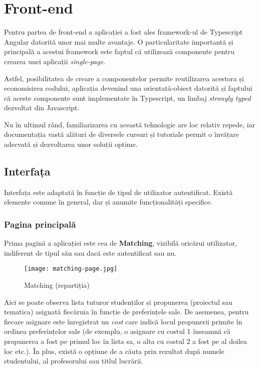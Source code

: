 \chapter{Front-end}

Pentru partea de front-end a aplicației a fost ales framework-ul de Typescript Angular datorită unor mai multe avantaje. O particularitate importantă și principală a acestui framework este faptul că utilizează componente pentru crearea unei aplicații \textit{single-page}.

Astfel, posibilitatea de creare a componentelor permite reutilizarea acestora și economisirea codului, aplicația devenind una orientată-obiect datorită și faptului că aceste componente sunt implementate în Typescript, un limbaj \textit{strongly typed} dezvoltat din Javascript.

Nu în ultimul rând, familiarizarea cu această tehnologie are loc relativ repede, iar documentația vastă alături de diversele cursuri și tutoriale permit o învățare adecvată și dezvoltarea unor soluții optime.

\section{Interfața}

Interfața este adaptată în funcție de tipul de utilizator autentificat. Există elemente comune în general, dar și anumite funcționalități specifice.

\subsection{Pagina principală}

Prima pagină a aplicației \thesistitle{} este cea de \textbf{Matching}, vizibilă oricărui utilizator, indiferent de tipul său sau dacă este autentificat sau nu.

\begin{figure}[H]
	\centering
	\texttt{[image: matching-page.jpg]}
	\caption{Matching (repartiția)}
\end{figure}

Aici se poate observa lista tuturor studenților și propunerea (proiectul sau tematica) asignată fiecăruia în funcție de preferințele sale. De asemenea, pentru fiecare asignare este înregistrat un \textit{cost} care indică locul propunerii primite în ordinea preferințelor sale (de exemplu, o asignare cu costul 1 înseamnă că propunerea a fost pe primul loc în lista sa, o alta cu costul 2 a fost pe al doilea loc etc.). În plus, există o opțiune de a căuta prin rezultat după numele studentului, al profesorului sau titlul lucrării.

